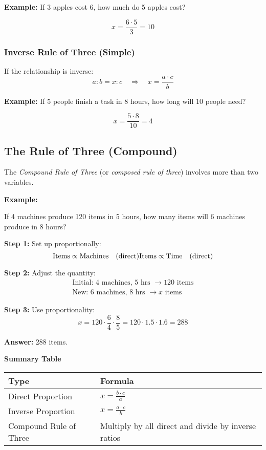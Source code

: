 \textbf{Example:} If 3 apples cost 6, how much do 5 apples cost?

\[
x = \frac{6 \cdot 5}{3} = 10
\]

\subsubsection*{Inverse Rule of Three (Simple)}

If the relationship is inverse:
\[
a : b = x : c \quad \Rightarrow \quad x = \frac{a \cdot c}{b}
\]

\textbf{Example:} If 5 people finish a task in 8 hours, how long will 10 people need?

\[
x = \frac{5 \cdot 8}{10} = 4
\]

\subsection{The Rule of Three (Compound)}

The \emph{Compound Rule of Three} (or \emph{composed rule of three}) involves more than two variables.

\textbf{Example:} 

If 4 machines produce 120 items in 5 hours, how many items will 6 machines produce in 8 hours?

\textbf{Step 1:} Set up proportionally:
\[
\text{Items} \propto \text{Machines} \quad (\text{direct}) \\
\text{Items} \propto \text{Time} \quad (\text{direct})
\]

\textbf{Step 2:} Adjust the quantity:
\begin{align*}
\text{Initial: } 4 \text{ machines, } 5 \text{ hrs } \rightarrow 120 \text{ items} \\
\text{New: } 6 \text{ machines, } 8 \text{ hrs } \rightarrow x \text{ items}
\end{align*}

\textbf{Step 3:} Use proportionality:
\[
x = 120 \cdot \frac{6}{4} \cdot \frac{8}{5} = 120 \cdot 1.5 \cdot 1.6 = 288
\]

\textbf{Answer:} 288 items.

\textbf{Summary Table}

\begin{center}
\begin{tabular}{|l|l|}
\hline
\textbf{Type} & \textbf{Formula} \\
\hline
Direct Proportion & \(x = \frac{b \cdot c}{a}\) \\
Inverse Proportion & \(x = \frac{a \cdot c}{b}\) \\
Compound Rule of Three & Multiply by all direct and divide by inverse ratios \\
\hline
\end{tabular}
\end{center}

